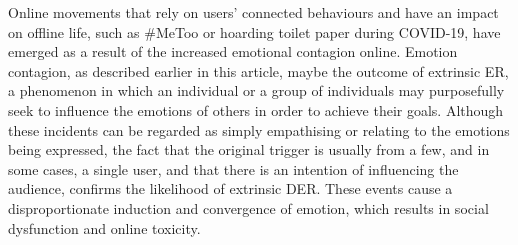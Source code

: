\documentclass[lettersize,journal]{IEEEtran}
\begin{document}
Online movements that rely on users' connected behaviours and have an impact on offline life, such as \#MeToo or hoarding toilet paper during COVID-19, have emerged as a result of the increased emotional contagion online. Emotion contagion, as described earlier in this article, maybe the outcome of extrinsic ER, a phenomenon in which an individual or a group of individuals may purposefully seek to influence the emotions of others in order to achieve their goals. Although these incidents can be regarded as simply empathising or relating to the emotions being expressed, the fact that the original trigger is usually from a few, and in some cases, a single user, and that there is an intention of influencing the audience, confirms the likelihood of extrinsic DER. These events cause a disproportionate induction and convergence of emotion, which results in social dysfunction and online toxicity.
 
\end{document}
